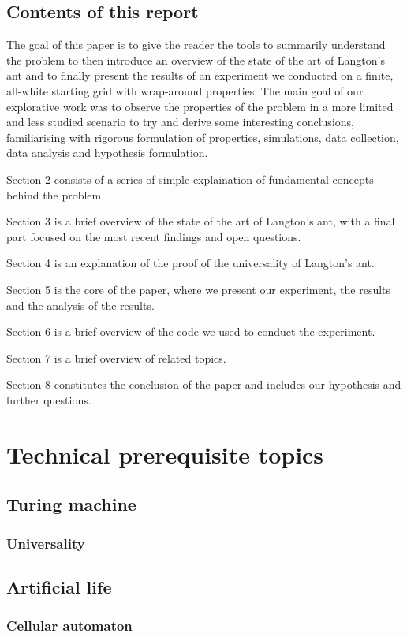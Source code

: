 \documentclass{article}
\begin{document}
\subsection{Contents of this report}
The goal of this paper is to give the reader the tools to summarily understand the problem to then introduce an overview of the state of the art 
of Langton's ant and to finally present the results of an experiment we conducted on a finite, all-white starting grid with wrap-around properties.
The main goal of our explorative work was to observe the properties of the problem in a more limited and less studied scenario to try and derive some interesting
conclusions, familiarising with rigorous formulation of properties, simulations, data collection, data analysis and hypothesis formulation.

Section 2 consists of a series of simple explaination of fundamental concepts behind the problem.

Section 3 is a brief overview of the state of the art of Langton's ant, with a final part focused on the most recent findings and open questions.

Section 4 is an explanation of the proof of the universality of Langton's ant.

Section 5 is the core of the paper, where we present our experiment, the results and the analysis of the results.

Section 6 is a brief overview of the code we used to conduct the experiment.

Section 7 is a brief overview of related topics.

Section 8 constitutes the conclusion of the paper and includes our hypothesis and further questions.

\section{Technical prerequisite topics}
\subsection{Turing machine}
\subsubsection{Universality}
\subsection{Artificial life}
\subsubsection{Cellular automaton}
\end{document}
